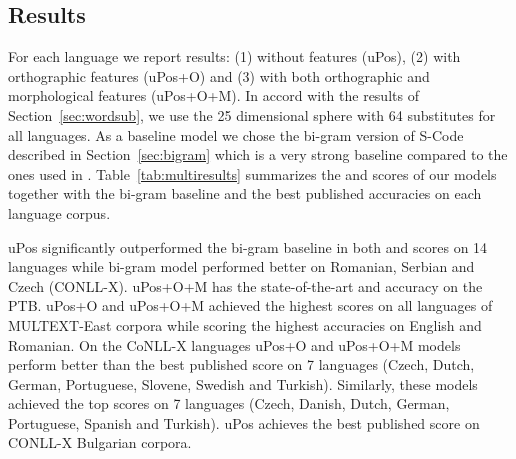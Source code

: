 \subsection{Results}
 
For each language we report results: (1) without features (uPos), (2)
with orthographic features (uPos+O) and (3) with both orthographic and
morphological features (uPos+O+M).  In accord with the results of
Section~\ref{sec:wordsub}, we use the 25 dimensional sphere with 64
substitutes for all languages.  As a baseline model we chose the
bi-gram version of S-Code described in Section~\ref{sec:bigram} which
is a very strong baseline compared to the ones used in
\cite{christodoulopoulos-goldwater-steedman:2011:EMNLP}.
Table~\ref{tab:multiresults} summarizes the \mto and \vm scores of our
models together with the bi-gram baseline and the best published
accuracies on each language corpus.

uPos significantly outperformed the bi-gram baseline in both \mto and
\vm scores on 14 languages while bi-gram model performed better on
Romanian, Serbian and Czech (CONLL-X).  uPos+O+M has the
state-of-the-art \mto and \vm accuracy on the PTB.  uPos+O and
uPos+O+M achieved the highest \mto scores on all languages of
MULTEXT-East corpora while scoring the highest \vm accuracies on
English and Romanian.  On the CoNLL-X languages uPos+O and uPos+O+M
models perform better than the best published \mto score on 7
languages (Czech, Dutch, German, Portuguese, Slovene, Swedish and
Turkish).  Similarly, these models achieved the top \vm scores on 7
languages (Czech, Danish, Dutch, German, Portuguese, Spanish and
Turkish).  uPos achieves the best published \mto score on CONLL-X
Bulgarian corpora.

